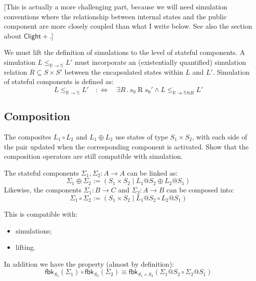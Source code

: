\documentclass[acmsmall,screen,review,anonymous]{acmart}
\newcommand{\kw}[1]{\ensuremath{ \mathsf{#1} }}
\newcommand{\ClightP}{\ensuremath{\mathsf{Clight+}}}
\begin{document}
[This is actually a more challenging part,
because we will need simulation conventions
where the relationship between internal states
and the public component are more closely coupled
than what I write below.
See also the section about \ClightP{}.]

We must lift the definition of simulations
to the level of stateful components.
A simulation $L \le_{\mathbb{R} \rightarrow \mathbb{S}} L'$
must incorporate an (existentially quantified)
simulation relation $R \subseteq S \times S'$
between the encapsulated states within $L$ and $L'$.
Simulation of stateful components is defined as:
\[
  L \le_{\mathbb{R} \rightarrow \mathbb{S}} L' \quad :\Leftrightarrow \quad
  \exists R \mathbin{.}
    s_0 \mathrel{R} s_0' \wedge
    L \le_{\mathbb{R} \twoheadrightarrow \mathbb{S}@R} L'
\]


\subsection{Composition} %

The composites $L_1 \circ L_2$ and $L_1 \oplus L_2$
use states of type $S_1 \times S_2$,
with each side of the pair updated when the corresponding component
is activated.
Show that the composition operators are
still compatible with simulation.

\begin{definition}[Linking]
The stateful components $\Sigma_1, \Sigma_2 : A \rightarrow A$
can be linked as:
\[
  \Sigma_1 \oplus \Sigma_2 :=
    ( S_1 \times S_2 \mid L_1@S_2 \oplus L_2@S_1 )
\]
Likewise, the components
$\Sigma_1 : B \rightarrow C$ and
$\Sigma_2 : A \rightarrow B$
can be composed into:
\[
  \Sigma_1 \circ \Sigma_2 :=
    ( S_1 \times S_2 \mid L_1@S_2 \circ L_2@S_1 )
\]
\end{definition}

\begin{lemma}
  This is compatible with:
  \begin{itemize}
    \item simulations;
    \item lifting.
  \end{itemize}
  In addition we have the property (almost by definition):
  \[
    \kw{fbk}_{S_1}(\Sigma_1) \circ \kw{fbk}_{S_2}(\Sigma_2) \equiv
    \kw{fbk}_{S_1 \times S_2}(\Sigma_1@S_2 \circ \Sigma_2@S_1)
  \]
\end{lemma}

\end{document}
